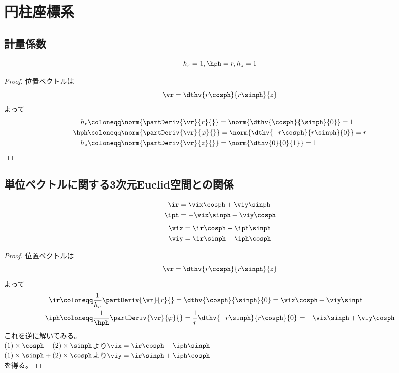 \chapter{円柱座標系}
    \section{計量係数}
        \begin{shadebox}
            \[h_r = 1, \hph = r, h_z = 1\]
        \end{shadebox}
        \begin{proof}
            \quad\par
            位置ベクトルは
            \[\vr = \dthv{r\cosph}{r\sinph}{z}\]
            よって
            \begin{align*}
                h_r &\coloneqq \norm{\partDeriv{\vr}{r}{}} = \norm{\dthv{\cosph}{\sinph}{0}} = 1\\
                \hph &\coloneqq \norm{\partDeriv{\vr}{\varphi}{}} = \norm{\dthv{-r\cosph}{r\sinph}{0}} = r\\
                h_z &\coloneqq \norm{\partDeriv{\vr}{z}{}} = \norm{\dthv{0}{0}{1}} = 1
            \end{align*}
        \end{proof}
    \section{単位ベクトルに関する3次元Euclid空間との関係}
        \begin{shadebox}
            \begin{align*}
                \ir &= \vix\cosph + \viy\sinph\\
                \iph &= -\vix\sinph + \viy\cosph
            \end{align*}
            \begin{align*}
                \vix &= \ir\cosph - \iph\sinph\\
                \viy &= \ir\sinph + \iph\cosph
            \end{align*}
        \end{shadebox}
        \begin{proof}
            \quad\par
            位置ベクトルは
            \[\vr = \dthv{r\cosph}{r\sinph}{z}\]
            よって
            \begin{align}
                \ir &\coloneqq \frac{1}{h_r}\partDeriv{\vr}{r}{} = \dthv{\cosph}{\sinph}{0} = \vix\cosph+\viy\sinph \\
                \iph &\coloneqq \frac{1}{\hph}\partDeriv{\vr}{\varphi}{} = \frac{1}{r}\dthv{-r\sinph}{r\cosph}{0} = -\vix\sinph+\viy\cosph
            \end{align}
            これを逆に解いてみる。\\
            $(1)\times\cosph-(2)\times\sinph$より$\vix = \ir\cosph - \iph\sinph$\\
            $(1)\times\sinph+(2)\times\cosph$より$\viy = \ir\sinph + \iph\cosph$\\
            を得る。
        \end{proof}
